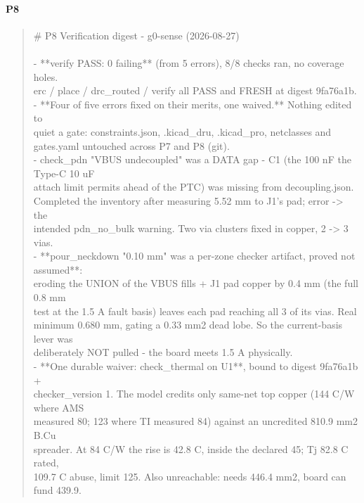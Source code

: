 \documentclass[11pt,a4paper]{article}
\begin{document}
\paragraph*{P8}
\begin{quote}\small\ttfamily\raggedright
\# P8 Verification digest - g0-sense (2026-08-27)\\
~\\
- {*}{*}verify PASS: 0 failing{*}{*} (from 5 errors), 8/8 checks ran, no coverage holes.\\
  erc / place / drc\_routed / verify all PASS and FRESH at digest 9fa76a1b.\\
- {*}{*}Four of five errors fixed on their merits, one waived.{*}{*} Nothing edited to\\
  quiet a gate: constraints.json, .kicad\_dru, .kicad\_pro, netclasses and\\
  gates.yaml untouched across P7 and P8 (git).\\
- check\_pdn "VBUS undecoupled" was a DATA gap - C1 (the 100 nF the Type-C 10 uF\\
  attach limit permits ahead of the PTC) was missing from decoupling.json.\\
  Completed the inventory after measuring 5.52 mm to J1's pad; error -\textgreater{} the\\
  intended pdn\_no\_bulk warning. Two via clusters fixed in copper, 2 -\textgreater{} 3 vias.\\
- {*}{*}pour\_neckdown "0.10 mm" was a per-zone checker artifact, proved not assumed{*}{*}:\\
  eroding the UNION of the VBUS fills + J1 pad copper by 0.4 mm (the full 0.8 mm\\
  test at the 1.5 A fault basis) leaves each pad reaching all 3 of its vias. Real\\
  minimum 0.680 mm, gating a 0.33 mm2 dead lobe. So the current-basis lever was\\
  deliberately NOT pulled - the board meets 1.5 A physically.\\
- {*}{*}One durable waiver: check\_thermal on U1{*}{*}, bound to digest 9fa76a1b +\\
  checker\_version 1. The model credits only same-net top copper (144 C/W where AMS\\
  measured 80; 123 where TI measured 84) against an uncredited 810.9 mm2 B.Cu\\
  spreader. At 84 C/W the rise is 42.8 C, inside the declared 45; Tj 82.8 C rated,\\
  109.7 C abuse, limit 125. Also unreachable: needs 446.4 mm2, board can fund 439.9.\\

\end{quote}
\end{document}
